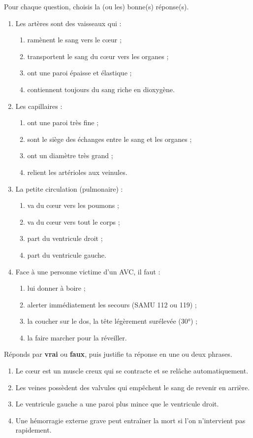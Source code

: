 \documentclass[11pt]{article}
\begin{document}
\begin{exercice}
Pour chaque question, choisis la (ou les) bonne(s) réponse(s).
\begin{enumerate}
\item Les artères sont des vaisseaux qui :
\begin{enumerate}
\item ramènent le sang vers le c\oe ur ;
\item transportent le sang du c\oe ur vers les organes ;
\item ont une paroi épaisse et élastique ;
\item contiennent toujours du sang riche en dioxygène.
\end{enumerate}
\item Les capillaires :
\begin{enumerate}
\item ont une paroi très fine ;
\item sont le siège des échanges entre le sang et les organes ;
\item ont un diamètre très grand ;
\item relient les artérioles aux veinules.
\end{enumerate}
\item La petite circulation (pulmonaire) :
\begin{enumerate}
\item va du c\oe ur vers les poumons ;
\item va du c\oe ur vers tout le corps ;
\item part du ventricule droit ;
\item part du ventricule gauche.
\end{enumerate}
\item Face à une personne victime d'un AVC, il faut :
\begin{enumerate}
\item lui donner à boire ;
\item alerter immédiatement les secours (SAMU 112 ou 119) ;
\item la coucher sur le dos, la tête légèrement surélevée (30°) ;
\item la faire marcher pour la réveiller.
\end{enumerate}
\end{enumerate}
\end{exercice}

\begin{exercice}
Réponds par \textbf{vrai} ou \textbf{faux}, puis justifie ta réponse en une ou deux phrases.
\begin{enumerate}
\item Le c\oe ur est un muscle creux qui se contracte et se relâche automatiquement.
\item Les veines possèdent des valvules qui empêchent le sang de revenir en arrière.
\item Le ventricule gauche a une paroi plus mince que le ventricule droit.
\item Une hémorragie externe grave peut entraîner la mort si l'on n'intervient pas rapidement.
\end{enumerate}
\end{exercice}
\end{document}
